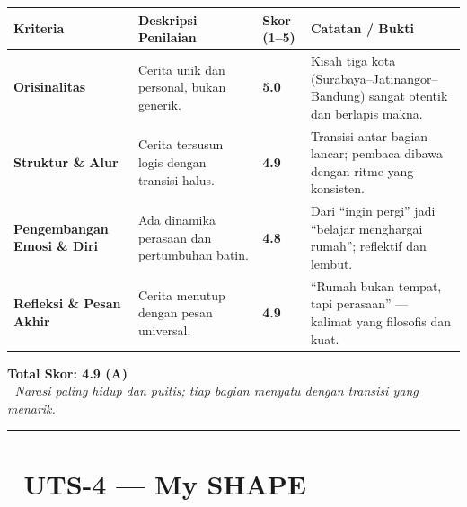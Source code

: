 \documentclass[
  letterpaper,
  DIV=11,
  numbers=noendperiod]{scrreprt}
\begin{document}
\begin{longtable}[]{@{}
  >{\raggedright\arraybackslash}p{}
  >{\raggedright\arraybackslash}p{}
  >{\raggedright\arraybackslash}p{}
  >{\raggedright\arraybackslash}p{}@{}}
\toprule\noalign{}
\begin{minipage}[b]{\linewidth}\raggedright
\textbf{Kriteria}
\end{minipage} & \begin{minipage}[b]{\linewidth}\raggedright
\textbf{Deskripsi Penilaian}
\end{minipage} & \begin{minipage}[b]{\linewidth}\raggedright
\textbf{Skor (1--5)}
\end{minipage} & \begin{minipage}[b]{\linewidth}\raggedright
\textbf{Catatan / Bukti}
\end{minipage} \\
\midrule\noalign{}
\endhead
\bottomrule\noalign{}
\endlastfoot
\textbf{Orisinalitas} & Cerita unik dan personal, bukan generik. &
\textbf{5.0} & Kisah tiga kota (Surabaya--Jatinangor--Bandung) sangat
otentik dan berlapis makna. \\
\textbf{Struktur \& Alur} & Cerita tersusun logis dengan transisi halus.
& \textbf{4.9} & Transisi antar bagian lancar; pembaca dibawa dengan
ritme yang konsisten. \\
\textbf{Pengembangan Emosi \& Diri} & Ada dinamika perasaan dan
pertumbuhan batin. & \textbf{4.8} & Dari ``ingin pergi'' jadi ``belajar
menghargai rumah''; reflektif dan lembut. \\
\textbf{Refleksi \& Pesan Akhir} & Cerita menutup dengan pesan
universal. & \textbf{4.9} & ``Rumah bukan tempat, tapi perasaan'' ---
kalimat yang filosofis dan kuat. \\
\end{longtable}

\textbf{Total Skor: 4.9 (A)}\\
📝 \emph{Narasi paling hidup dan puitis; tiap bagian menyatu dengan
transisi yang menarik.}

\begin{center}\rule{0.5\linewidth}{0.5pt}\end{center}

\section{🧠 UTS-4 --- My SHAPE}\label{uts-4-my-shape-1}
\end{document}
